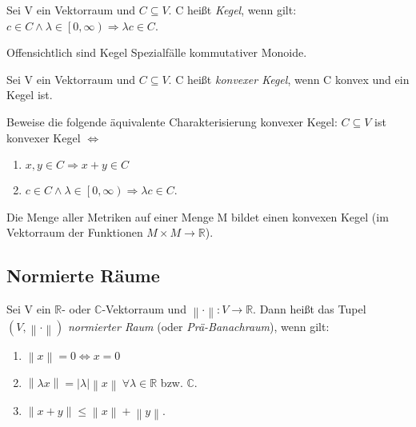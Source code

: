 \documentclass[10pt]{scrbook}
\begin{document}
\begin{Def}
Sei V ein Vektorraum und $C\subseteq V$. C heißt \emph{Kegel}, wenn gilt: $c\in C\wedge \lambda\in\left[0, \infty\right)\Rightarrow\lambda c\in C$.
\end{Def}

\begin{Bem}
Offensichtlich sind Kegel Spezialfälle kommutativer Monoide.
\end{Bem}

\begin{Def}
Sei V ein Vektorraum und $C\subseteq V$. C heißt \emph{konvexer Kegel}, wenn C konvex und ein Kegel ist.
\end{Def}

\begin{Bem}
Beweise die folgende äquivalente Charakterisierung konvexer Kegel: $C\subseteq V$ ist konvexer Kegel $\Leftrightarrow$
\begin{enumerate}
	\item $x,y\in C\Rightarrow x+y\in C$
	\item $c\in C\wedge \lambda\in\left[0, \infty\right)\Rightarrow\lambda c\in C$.
\end{enumerate}
\end{Bem}

\begin{Bem}
Die Menge aller Metriken auf einer Menge M bildet einen konvexen Kegel (im Vektorraum der Funktionen $M\times M\rightarrow \mathbb{R}$).
\end{Bem}

\subsection{Normierte Räume}

\begin{Def}
Sei V ein $\mathbb{R}$- oder $\mathbb{C}$-Vektorraum und $\left\|\cdot\right\|: V\rightarrow \mathbb{R}$. Dann heißt das Tupel $(V, \left\|\cdot\right\|)$ \emph{normierter Raum} (oder \emph{Prä-Banachraum}), wenn gilt:
\begin{enumerate}
	\item $\left\|x\right\|=0 \Leftrightarrow x=0$
	\item $\left\|\lambda x\right\|=\left|\lambda\right| \left\|x\right\|\ \forall \lambda\in \mathbb{R}$ bzw. $\mathbb{C}$.
	\item $\left\|x+y\right\|\leq \left\|x\right\|+\left\|y\right\|$.
\end{enumerate}
\end{Def}
\end{document}
